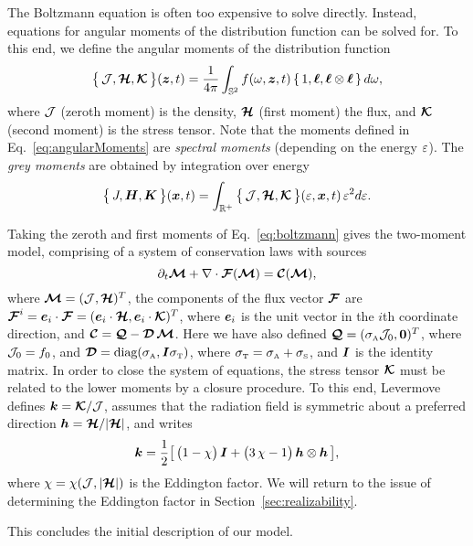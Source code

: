 The Boltzmann equation is often too expensive to solve directly.  
Instead, equations for angular moments of the distribution function can be solved for.  
To this end, we define the angular moments of the distribution function
\begin{equation}
  \big\{\,\mathcal{J},\boldsymbol{\mathcal{H}},\boldsymbol{\mathcal{K}}\,\big\}(\boldsymbol{z},t)
  =\frac{1}{4\pi}\int_{\mathbb{S}^{2}}f(\omega,\boldsymbol{z},t)\,\{\,1,\boldsymbol{\ell},\boldsymbol{\ell}\otimes\boldsymbol{\ell}\,\}\,d\omega,
  \label{eq:angularMoments}
\end{equation}
where $\mathcal{J}$ (zeroth moment) is the density, $\boldsymbol{\mathcal{H}}$ (first moment) the flux, and $\boldsymbol{\mathcal{K}}$ (second moment) is the stress tensor.  
Note that the moments defined in Eq.~\ref{eq:angularMoments} are \emph{spectral moments} (depending on the energy $\varepsilon$).  
The \emph{grey moments} are obtained by integration over energy
\begin{equation}
  \big\{\,J,\boldsymbol{H},\boldsymbol{K}\,\big\}(\boldsymbol{x},t)
  =\int_{\mathbb{R}^{+}}\big\{\,\mathcal{J},\boldsymbol{\mathcal{H}},\boldsymbol{\mathcal{K}}\,\big\}(\varepsilon,\boldsymbol{x},t)\,\varepsilon^{2}d\varepsilon.  
\end{equation}

Taking the zeroth and first moments of Eq.~\eqref{eq:boltzmann} gives the two-moment model, comprising of a system of conservation laws with sources
\begin{equation}
  \partial_{t}{\boldsymbol{\mathcal{M}}}+\nabla\cdot\boldsymbol{\mathcal{F}}(\boldsymbol{\mathcal{M}})=\boldsymbol{\mathcal{C}}(\boldsymbol{\mathcal{M}}),
  \label{eq:momentEquations}
\end{equation}
where $\boldsymbol{\mathcal{M}}=(\mathcal{J},\boldsymbol{\mathcal{H}})^{T}$, the components of the flux vector $\boldsymbol{\mathcal{F}}$ are $\boldsymbol{\mathcal{F}}^{i}=\boldsymbol{e}_{i}\cdot\boldsymbol{\mathcal{F}}=(\boldsymbol{e}_{i}\cdot\boldsymbol{\mathcal{H}},\boldsymbol{e}_{i}\cdot\boldsymbol{\mathcal{K}})^{T}$, where $\boldsymbol{e}_{i}$ is the unit vector in the $i$th coordinate direction, and $\boldsymbol{\mathcal{C}}=\boldsymbol{\mathcal{Q}}-\boldsymbol{\mathcal{D}}\,\boldsymbol{\mathcal{M}}$.  
Here we have also defined $\boldsymbol{\mathcal{Q}}=(\sigma_{\mbox{\tiny A}}\mathcal{J}_{0},\boldsymbol{0})^{T}$, where $\mathcal{J}_{0}=f_{0}$, and $\boldsymbol{\mathcal{D}}=\mbox{diag}(\sigma_{\mbox{\tiny A}},\boldsymbol{I}\sigma_{\mbox{\tiny T}})$, where $\sigma_{\mbox{\tiny T}}=\sigma_{\mbox{\tiny A}}+\sigma_{\mbox{\tiny S}}$, and $\boldsymbol{I}$ is the identity matrix.  
In order to close the system of equations, the stress tensor $\boldsymbol{\mathcal{K}}$ must be related to the lower moments by a closure procedure.  
To this end, Levermove \cite{levermore_1984} defines $\boldsymbol{k}=\boldsymbol{\mathcal{K}}/\mathcal{J}$, assumes that the radiation field is symmetric about a preferred direction $\boldsymbol{h}=\boldsymbol{\mathcal{H}}/|\boldsymbol{\mathcal{H}}|$, and writes
\begin{equation}
  \boldsymbol{k}=\frac{1}{2}\big[\,\big(1-\chi\big)\,\boldsymbol{I}+\big(3\,\chi-1\big)\,\boldsymbol{h}\otimes\boldsymbol{h}\,\big],
\end{equation}
where $\chi=\chi(\mathcal{J},|\boldsymbol{\mathcal{H}}|)$ is the Eddington factor.  
We will return to the issue of determining the Eddington factor in Section~\ref{sec:realizability}.  

This concludes the initial description of our model.  